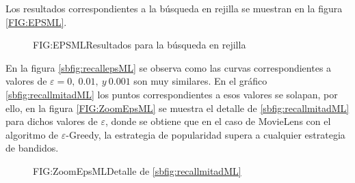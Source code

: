 Los resultados correspondientes a la búsqueda en rejilla se muestran en la figura \ref{FIG:EPSML}.

\begin{figure}[Resultados de la búsqueda en rejilla para $\varepsilon$-Greedy]{FIG:EPSML}{Resultados para la búsqueda en rejilla}
   \quad
\end{figure}

En la figura \ref{sbfig:recallepsML} se observa como las curvas correspondientes a valores de $\varepsilon = 0, \ 0.01, \ y \ 0.001$ son muy similares. En el gráfico \ref{sbfig:recallmitadML} los puntos correspondientes a esos valores se solapan, por ello, en la figura \ref{FIG:ZoomEpsML} se muestra el detalle de \ref{sbfig:recallmitadML} para dichos valores de $\varepsilon$, donde se obtiene que en el caso de MovieLens con el algoritmo de $\varepsilon$-Greedy, la estrategia de popularidad supera a cualquier estrategia de bandidos.

\begin{figure}[Detalle de la exploración para $\varepsilon=0, \ 0.001, \ 0.01$]{FIG:ZoomEpsML}{Detalle de \ref{sbfig:recallmitadML}}
\end{figure}